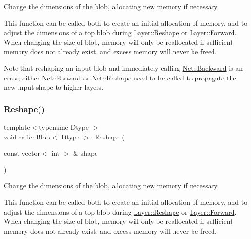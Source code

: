 Change the dimensions of the blob, allocating new memory if necessary. 

This function can be called both to create an initial allocation of memory, and to adjust the dimensions of a top blob during \mbox{\hyperlink{classcaffe_1_1_layer_a7fe981e8af8d93d587acf2a952be563d}{Layer\+::\+Reshape}} or \mbox{\hyperlink{classcaffe_1_1_layer_ab57d272dabe8c709d2a785eebe72ca57}{Layer\+::\+Forward}}. When changing the size of blob, memory will only be reallocated if sufficient memory does not already exist, and excess memory will never be freed.

Note that reshaping an input blob and immediately calling \mbox{\hyperlink{classcaffe_1_1_net_a7a1a6d17347106dd1284b1b6d28cb4e9}{Net\+::\+Backward}} is an error; either \mbox{\hyperlink{classcaffe_1_1_net_a6f6cf9d40637f7576828d856bb1b1826}{Net\+::\+Forward}} or \mbox{\hyperlink{classcaffe_1_1_net_a8417af82aa83be45d39aab735bdead1d}{Net\+::\+Reshape}} need to be called to propagate the new input shape to higher layers. \mbox{\label{classcaffe_1_1_blob_ac9ce456aa623ff3f4d24225a0db14404}} 
\subsubsection{\texorpdfstring{Reshape()}{Reshape()}\hspace{0.1cm}{\footnotesize\ttfamily [2/2]}}
{\footnotesize\ttfamily template$<$typename Dtype $>$ \\
void \mbox{\hyperlink{classcaffe_1_1_blob}{caffe\+::\+Blob}}$<$ Dtype $>$\+::Reshape (\begin{DoxyParamCaption}\item[{const vector$<$ int $>$ \&}]{shape }\end{DoxyParamCaption})}



Change the dimensions of the blob, allocating new memory if necessary. 

This function can be called both to create an initial allocation of memory, and to adjust the dimensions of a top blob during \mbox{\hyperlink{classcaffe_1_1_layer_a7fe981e8af8d93d587acf2a952be563d}{Layer\+::\+Reshape}} or \mbox{\hyperlink{classcaffe_1_1_layer_ab57d272dabe8c709d2a785eebe72ca57}{Layer\+::\+Forward}}. When changing the size of blob, memory will only be reallocated if sufficient memory does not already exist, and excess memory will never be freed.

